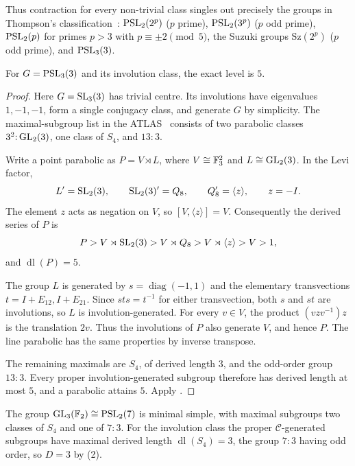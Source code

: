 Thus contraction for every non-trivial class singles out precisely the
groups in Thompson's classification~\cite{Thompson1968}:
$\operatorname{PSL}_2(2^p)$ ($p$ prime), $\operatorname{PSL}_2(3^p)$ ($p$ odd prime), $\operatorname{PSL}_2(p)$ for
primes $p>3$ with $p\equiv\pm2\pmod5$, the Suzuki groups
$\mathrm{Sz}(2^p)$ ($p$ odd prime), and $\operatorname{PSL}_3(3)$.

\begin{proposition}
\label{prop:psl33-level}
For $G=\operatorname{PSL}_3(3)$ and its involution class, the exact level is $5$.
\end{proposition}
\begin{proof}
Here $G=\operatorname{SL}_3(3)$ has trivial centre. Its involutions have eigenvalues
$1,-1,-1$, form a single conjugacy class, and generate $G$ by simplicity.
The maximal-subgroup list in the ATLAS~\cite{ATLASL33} consists of
two parabolic classes $3^2{:}\operatorname{GL}_2(3)$, one class of $S_4$, and $13{:}3$.

Write a point parabolic as $P=V\rtimes L$, where
$V\cong\mathbb{F}_3^2$ and $L\cong\operatorname{GL}_2(3)$. In the Levi factor,
\[
 L'=\operatorname{SL}_2(3),\qquad \operatorname{SL}_2(3)'=Q_8,\qquad
 Q_8'=\langle z\rangle,\qquad z=-I.
\]
The element $z$ acts as negation on $V$, so $[V,\langle z\rangle]=V$.
Consequently the derived series of $P$ is
\[
 P>V\rtimes\operatorname{SL}_2(3)>V\rtimes Q_8>
 V\rtimes\langle z\rangle>V>1,
\]
and $\operatorname{dl}(P)=5$.

The group $L$ is generated by
$s=\operatorname{diag}(-1,1)$ and the elementary transvections
$t=I+E_{12},I+E_{21}$. Since $sts=t^{-1}$ for either transvection,
both $s$ and $st$ are involutions, so $L$ is involution-generated.
For every $v\in V$, the product $(v z v^{-1})z$ is the translation
$2v$. Thus the involutions of $P$ also generate $V$, and hence $P$.
The line parabolic has the same properties by inverse transpose.

The remaining maximals are $S_4$, of derived length $3$, and
the odd-order group $13{:}3$. Every proper involution-generated
subgroup therefore has derived length at most $5$, and a parabolic
attains $5$.
Apply .
\end{proof}

\begin{remark}[$\PSL_2(7)$]
\label{rem:gl32}
The group $\operatorname{GL}_3(\mathbb{F}_2)\cong\operatorname{PSL}_2(7)$ is minimal simple, with maximal
subgroups two classes of $S_4$ and one of $7{:}3$. For the involution
class the proper $\mathcal{C}$-generated subgroups have maximal derived
length $\operatorname{dl}(S_4)=3$, the group $7{:}3$ having odd order,
so $D=3$ by (2).
\end{remark}

